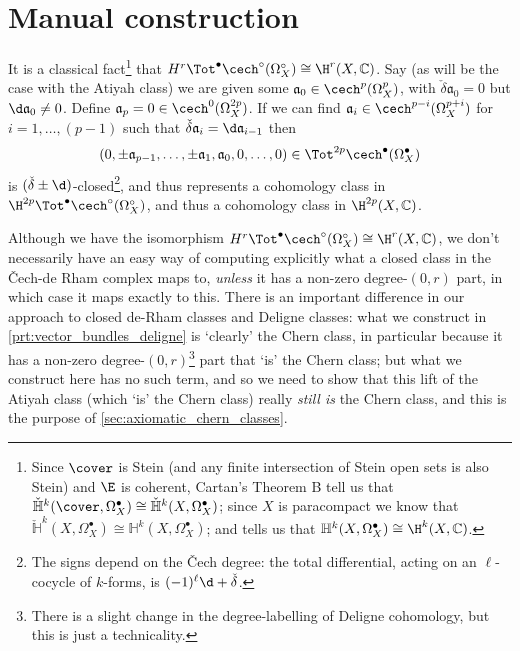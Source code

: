 


\section{Manual construction} %
\label{sec:manual_construction}

    It is a classical fact\footnote{Since $\cover$ is Stein (and any finite intersection of Stein open sets is also Stein) and $\E$ is coherent, Cartan's Theorem B tell us that $\check{\mathbb{H}}^k(\cover,\Omega_X^\bullet)\cong\check{\mathbb{H}}^k(X,\Omega_X^\bullet)$; since $X$ is paracompact we know that $\check{\mathbb{H}}^k(X,\Omega_X^\bullet)\cong\mathbb{H}^k(X,\Omega_X^\bullet)$; and \cite[Theorem~8.1]{Voisin:2002wn} tells us that $\mathbb{H}^k(X,\Omega_X^\bullet)\cong\H^k(X,\mathbb{C})$.} that $H^r\Tot^\bullet\cech^\circ(\Omega^\circ_X) \cong \H^r(X,\mathbb{C})$.
    Say (as will be the case with the Atiyah class) we are given some $\mathfrak{a}_0\in\cech^p(\Omega_X^p)$, with $\check{\delta}\mathfrak{a}_0=0$ but $\d\mathfrak{a}_0\neq0$.
    Define $\mathfrak{a}_p=0\in\cech^0(\Omega_X^{2p})$.
    If we can find $\mathfrak{a}_i\in\cech^{p-i}(\Omega^{p+i}_X)$ for $i=1,\ldots,(p-1)$ such that $\check\delta\mathfrak{a}_i=\d\mathfrak{a}_{i-1}$ then
    \[
        (0,\pm\mathfrak{a}_{p-1},\ldots,\pm\mathfrak{a}_1,\mathfrak{a}_0,0,\ldots,0) \in \Tot^{2p}\cech^\bullet(\Omega^\bullet_X)
    \]
    is $(\check\delta\pm\d)$-closed\footnote{The signs depend on the Čech degree: the total differential, acting on an $\ell$-cocycle of $k$-forms, is $(-1)^\ell\d+\check\delta$.}, and thus represents a cohomology class in $\H^{2p}\Tot^\bullet\cech^\circ(\Omega_X^\circ)$, and thus a cohomology class in $\H^{2p}(X,\mathbb{C})$.

    \begin{note}
        Although we have the isomorphism $H^r\Tot^\bullet\cech^\circ(\Omega^\circ_X) \cong \H^r(X,\mathbb{C})$, we don't necessarily have an easy way of computing explicitly what a closed class in the Čech-de Rham complex maps to, \emph{unless} it has a non-zero degree-$(0,r)$ part, in which case it maps exactly to this.
        There is an important difference in our approach to closed de-Rham classes and Deligne classes: what we construct in \cref{prt:vector_bundles_deligne} is `clearly' the Chern class, in particular because it has a non-zero degree-$(0,r)$\footnote{There is a slight change in the degree-labelling of Deligne cohomology, but this is just a technicality.} part that `is' the Chern class; but what we construct here has no such term, and so we need to show that this lift of the Atiyah class (which `is' the Chern class) really \emph{still is} the Chern class, and this is the purpose of \cref{sec:axiomatic_chern_classes}.
    \end{note}
    
